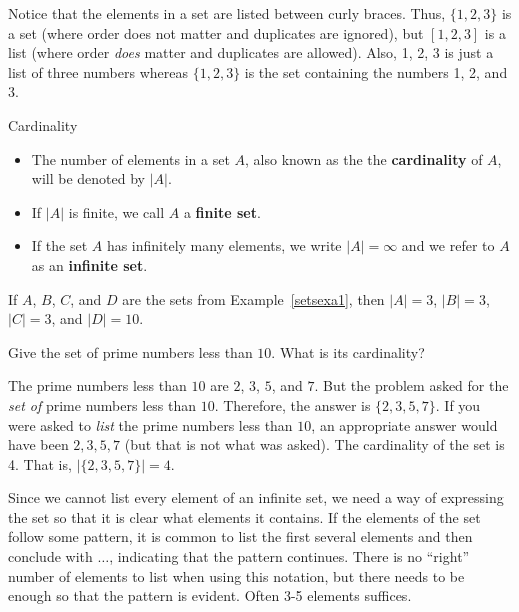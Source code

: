 Notice that the elements in a set are listed between curly braces.  
Thus, $\{1,2,3\}$ is a set (where order does not matter and duplicates are ignored), 
but $[1,2,3]$ is a list (where order {\em does} matter and duplicates are allowed).
Also, 1, 2, 3 is just a list of three numbers whereas $\{1,2,3\}$ is the set containing
the numbers 1, 2, and 3. 


\begin{df}
Cardinality

\begin{itemize}
\item
The number of elements in a set $A$, also known as the 
the {\bf cardinality} of $A$, will be denoted by $|A|$.
\item
If $|A|$ is finite, we call $A$ a {\bf finite set}.
\item
If the set $A$ has infinitely many elements, we write $|A| = \infty$
and we refer to $A$ as an {\bf infinite set}.
\end{itemize}
\end{df}


\begin{exa}
If $A$, $B$, $C$, and $D$ are the sets from Example~\ref{setsexa1},
 then $|A|=3$, $|B|=3$, $|C|=3$, and $|D|=10$.
\end{exa}

\begin{exer}
Give the set of prime numbers less than $10$. What is its cardinality?

\noindent
\answerline
\begin{answer}
The prime numbers less than $10$ are $2$, $3$, $5$, and $7$.
But the problem asked for the {\em set of} prime numbers less than $10$.
Therefore, the answer is $\{2, 3, 5, 7\}$.
If you were asked to {\em list} the prime numbers less than $10$,
an appropriate answer would have been $2,3,5,7$ (but that is not what was asked).
The cardinality of the set is 4. That is, $|\{2, 3, 5, 7\}|=4$.
\end{answer}
\end{exer}


Since we cannot list every element of an infinite set, we need a way of expressing the set so that it is 
clear what elements it contains. If the elements of the set follow some pattern, it is common to list the
first several elements and then conclude with $\ldots$, indicating that the pattern continues.
There is no ``right'' number of elements to list when using this notation, but there needs to be enough
so that the pattern is evident. Often 3-5 elements suffices.

